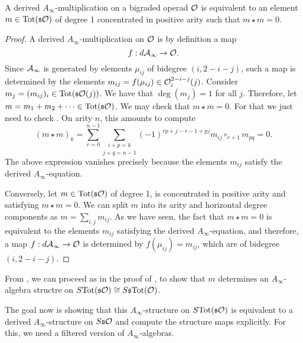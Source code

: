 \documentclass[join.tex]{subfiles}
\begin{document}
\begin{lem}\label{mstar}
A derived $A_\infty$-multiplication on a bigraded operad ${\mathcal O}$ is equivalent to an element $m\in\mathrm{Tot}(\mathfrak{s}{\mathcal O})$ of degree 1 concentrated in positive arity such that $m\star m = 0$. 
\end{lem}
\begin{proof}
A derived $A_\infty$-multiplication on ${\mathcal O}$ is by definition a map 
\[f:d\mathcal{A}_\infty\to{\mathcal O}.\]
Since $\mathcal{A}_\infty$ is generated by elements $\mu_{ij}$ of bidegree $(i,2-i-j)$, such a map is determined by the elements $m_{ij}=f(\mu_{ij})\in{\mathcal O}^{2-i-j}_i(j)$. Consider $m_j = (m_{ij})_i\in\mathrm{Tot}(\mathfrak{s}{\mathcal O}(j))$. We have that $\deg(m_j)=1$ for all $j$. Therefore, let $m=m_1+m_2+\cdots\in\mathrm{Tot}(\mathfrak{s}{\mathcal O})$. We may check that $m\star m=0$. For that we just need to check . On arity $n$, this amounts to compute 
\[(m\star m)_k = \sum_{r=0}^{n-1}\underset{j+q=n-1}{\sum_{i+p=k}}(-1)^{rp+j-r-1+ pj}m_{ij}\circ_{r+1}m_{pq}=0.\]
The above expression vanishes precisely because the elements $m_{ij}$ satisfy the derived $A_\infty$-equation.

Conversely, let $m\in\mathrm{Tot}(\mathfrak{s}{\mathcal O})$ of degree 1, is concentrated in positive arity and satisfying $m\star m=0$. We can split $m$ into its arity and horizontal degree components as $m=\sum_{i,j}m_{ij}$. As we have seen, the fact that $m\star m=0$ is equivalent to the elements $m_{ij}$ satisfying the derived $A_\infty$-equation, and therefore, a map $f:d\mathcal{A}_\infty\to{\mathcal O}$ is determined by $f(\mu_{ij})=m_{ij}$, which are of bidegree $(i,2-i-j)$. 
\end{proof}


From , we can proceed as in the proof of , to show that $m$ determines an $A_\infty$-algebra structre on $S\mathrm{Tot}(\mathfrak{s}{\mathcal O})\cong S\mathfrak{s} \mathrm{Tot}({\mathcal O})$. %

The goal now is showing that this $A_\infty$-structure on $S\mathrm{Tot}(\mathfrak{s}{\mathcal O})$ is equivalent to a derived $A_\infty$-structure on $S\mathfrak{s} {\mathcal O}$ and compute the structure maps explicitly. For this, we need a filtered version of $A_\infty$-algebras.
\end{document}
